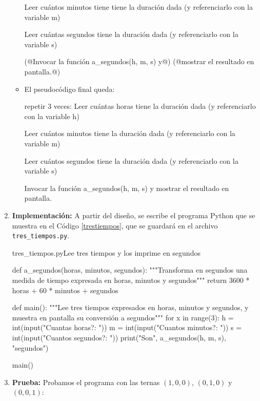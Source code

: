 \begin{enumerate}
\begin{itemize}
\begin{codigo-nohl-sn}
Leer cuántos minutos tiene tiene la duración dada
 (y referenciarlo con la variable m)

Leer cuántas segundos tiene la duración dada
 (y referenciarlo con la variable s)

(@Invocar la función a_segundos(h, m, s) y@)
(@mostrar el resultado en pantalla.@)
\end{codigo-nohl-sn}

\item El pseudocódigo final queda:

\begin{codigo-nohl-sn}
repetir 3 veces:
    Leer cuántas horas tiene la duración dada
     (y referenciarlo con la variable h)

    Leer cuántos minutos tiene la duración dada
     (y referenciarlo con la variable m)

    Leer cuántos segundos tiene la duración dada
     (y referenciarlo con la variable s)

    Invocar la función a_segundos(h, m, s) y
    mostrar el resultado en pantalla.
\end{codigo-nohl-sn}

\end{itemize}
\item {\bf Implementación:} A partir del diseño, se escribe el programa
Python que se muestra en el Código \ref{trestiempos}, que se guardará
en el archivo \verb!tres_tiempos.py!.

\begin{codigo}{\label{trestiempos} tres\_tiempos.py}{Lee tres tiempos y los imprime en segundos}
\begin{codigo-python}
def a_segundos(horas, minutos, segundos):
    """Transforma en segundos una medida de tiempo expresada en
       horas, minutos y segundos"""
    return 3600 * horas + 60 * minutos + segundos

def main():
    """Lee tres tiempos expresados en horas, minutos y segundos,
       y muestra en pantalla su conversión a segundos"""
    for x in range(3):
        h = int(input("Cuantas horas?: "))
        m = int(input("Cuantos minutos?: "))
        s = int(input("Cuantos segundos?: "))
        print("Son", a_segundos(h, m, s), "segundos")

main()
\end{codigo-python}
\end{codigo}

\item {\bf Prueba: } Probamos el programa con las ternas $(1,0,0)$, $(0,1,0)$ y
$(0,0,1)$:

\end{enumerate}

